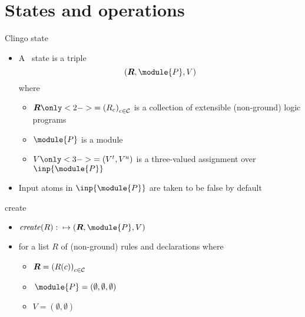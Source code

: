 \section{States and operations}
\begin{frame}{Clingo state}
  \begin{itemize}
  \item<1-> A \alert{\clingo\ state} is a triple
    \[
    ( \boldsymbol{R},\module{P},V )
    \]
    where

    \begin{itemize}\normalsize
    \item $\boldsymbol{R}\only<2->{=\left(\RRG_c\right)_{c\in\mathcal{C}}}$ is a collection of extensible (non-ground) logic programs
      \smallskip
    \item $\module{P}$ is a module
      \smallskip
    \item $V\only<3->{=( V^t,V^u )}$ is a three-valued assignment over $\inp{\module{P}}$
    \end{itemize}
    \medskip
  \item<only@4->  Input atoms in $\inp{\module{P}}$ are taken to be false by default
  \end{itemize}
\end{frame}
\begin{frame}{create}
  \begin{itemize}
  \item $\mathit{create}(R): {} \mapsto ( \boldsymbol{R},\module{P},V )$
    \smallskip
  \item []
    for a list $R$ of (non-ground) rules and declarations
    \pause[2]%
    where
    \smallskip
    \begin{itemize}\normalsize
    \item $\boldsymbol{R}=\left(R(c)\right)_{c\in\mathcal{C}}$
    \item $\,\module{P} = (\emptyset,\emptyset,\emptyset)$
    \item $V=(\emptyset,\emptyset)$
    \end{itemize}
  \end{itemize}
\end{frame}
